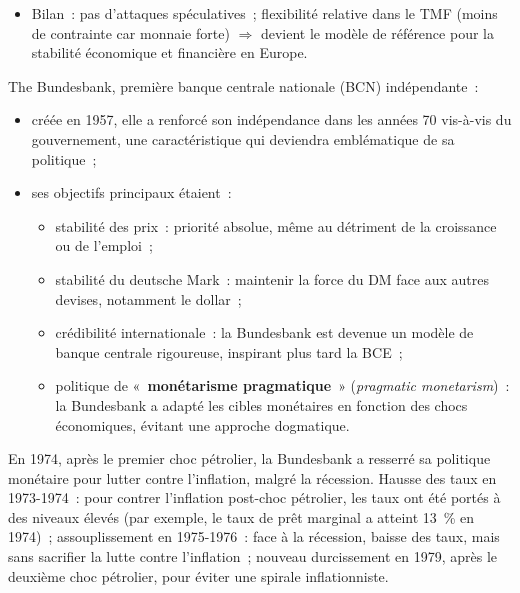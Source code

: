 \begin{itemize}
\begin{itemize}
        dollars, tandis que la France avait un déficit de 6 milliards)~;
      \item appréciation du DM $\Rightarrow$ suppression du risque d'inflation importée~;
      \item $\Rightarrow$ achat de devises étrangères (des exportations) contre DM pour
        augmenter la quantité de DM $\Rightarrow$ limite l'appréciation~;
      \item $\Rightarrow$ rachat de monnaies européennes contre DM.
    \end{itemize}
  \item Bilan~: pas d'attaques spéculatives~; flexibilité relative dans le TMF (moins de
    contrainte car monnaie forte) $\Rightarrow$ devient le modèle de référence pour la
    stabilité économique et financière en Europe.
\end{itemize}

The Bundesbank, première banque centrale nationale (BCN) indépendante~:
\begin{itemize}
  \item créée en 1957, elle a renforcé son indépendance dans les années 70 vis-à-vis du
    gouvernement, une caractéristique qui deviendra emblématique de sa politique~;
  \item ses objectifs principaux étaient~:
    \begin{itemize}
      \item stabilité des prix~: priorité absolue, même au détriment de la croissance ou
        de l'emploi~;
      \item stabilité du deutsche Mark~: maintenir la force du DM face aux autres
        devises, notamment le dollar~;
      \item crédibilité internationale~: la Bundesbank est devenue un modèle de banque
        centrale rigoureuse, inspirant plus tard la BCE~;
      \item politique de «~\textbf{monétarisme pragmatique}~» (\textit{pragmatic
        monetarism})~: la Bundesbank a adapté les cibles monétaires en fonction des
        chocs économiques, évitant une approche dogmatique.
    \end{itemize}
\end{itemize}

\begin{example}
  En 1974, après le premier choc pétrolier, la Bundesbank a resserré sa politique
  monétaire pour lutter contre l'inflation, malgré la récession. Hausse des taux en
  1973-1974~: pour contrer l'inflation post-choc pétrolier, les taux ont été portés à
  des niveaux élevés (par exemple, le taux de prêt marginal a atteint 13~\% en 1974)~;
  assouplissement en 1975-1976~: face à la récession, baisse des taux, mais sans
  sacrifier la lutte contre l'inflation~; nouveau durcissement en 1979, après le
  deuxième choc pétrolier, pour éviter une spirale inflationniste.
\end{example}

